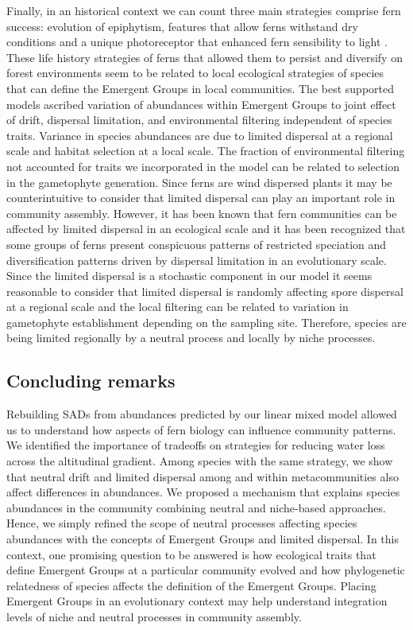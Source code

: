 \documentclass[12pt]{article}
\begin{document}
Finally, in an historical context we can count three main strategies comprise
fern success: evolution of epiphytism, features that allow ferns
withstand dry conditions and a unique photoreceptor that enhanced fern
sensibility to light \citep{Schneider2004, Schuettpelz2009}. These life
history strategies of ferns that allowed them to persist and 
diversify on forest environments seem to be related to local ecological
strategies of species that can define the Emergent Groups in local
communities. 
The best supported models ascribed variation of abundances within
Emergent Groups to joint effect of drift, dispersal limitation, and environmental filtering independent of species traits.
Variance in species abundances are due to limited dispersal at a regional scale and habitat selection at a local scale. The fraction of environmental filtering not accounted for traits we incorporated in the model can be related to selection in the gametophyte generation.  
Since ferns are wind
dispersed plants it may be counterintuitive to consider that limited
dispersal can play an important role in community assembly. However,
it has been known that fern communities can be affected by limited dispersal \citep{Tuomisto2003c, Karst2005, Jones2006} in an ecological scale and 
it has been recognized that some groups of ferns present conspicuous
patterns of restricted speciation and diversification patterns driven
by dispersal limitation \citep{Korall2014, Labiak2014, Sundue2014} in an evolutionary scale. Since the limited dispersal is a stochastic component
in our model it seems reasonable to consider that limited dispersal is
randomly affecting spore dispersal at a regional scale and the local filtering can be related to variation in gametophyte establishment depending on the sampling site. Therefore, species are being limited regionally by a neutral process and locally by niche processes. 


\subsection*{Concluding remarks}

Rebuilding SADs from abundances predicted by our linear mixed model  
allowed us to understand how aspects of fern biology can influence community
patterns. We %
identified the importance of tradeoffs on strategies for reducing
water loss across the altitudinal gradient. Among species with the
same strategy, we show that
neutral drift and limited dispersal among and within metacommunities also affect differences in
abundances.  
We proposed a mechanism that explains species
abundances in the community
combining neutral and niche-based
approaches. Hence, we simply refined the scope of neutral processes
affecting species abundances with the concepts of Emergent Groups and
limited dispersal. 
In this context, one promising question to be answered is
how ecological traits that define Emergent Groups at a particular community
evolved and how phylogenetic relatedness of species affects the
definition of the Emergent Groups. Placing Emergent Groups in an
evolutionary context may help understand integration levels of niche
and neutral processes in community assembly.
\end{document}
